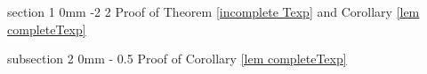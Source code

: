 \documentclass{article}
\makeatletter
\newcommand{\1}{\mathds{1}}
\numberwithin{equation}{section}
\theoremstyle{plain} %
\theoremstyle{remark}
\renewcommand{\section}{\@startsection
	{section}%
	{1}%
	{0mm}%
	{-2\baselineskip}%
	{2\baselineskip}%
	{\normalfont\large\scshape\centering}} %
\renewcommand{\subsection}{\@startsection
	{subsection}%
	{2}%
	{0mm}%
	{-\baselineskip}%
	{0.5\baselineskip}%
	{\normalfont\bf\itshape}} %
\makeatother
\begin{document}
\section{Proof of Theorem \ref{incomplete Texp} and Corollary \ref{lem completeTexp}}\label{sec global}



\subsection{Proof of Corollary \ref{lem completeTexp}}\label{sec lastglobal}
\end{document}
